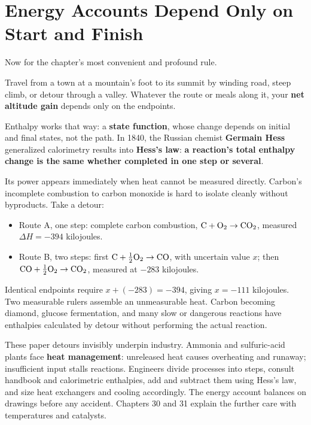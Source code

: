 \section{Energy Accounts Depend Only on Start and Finish}

Now for the chapter's most convenient and profound rule.

Travel from a town at a mountain's foot to its summit by winding road, steep climb, or detour through a valley. Whatever the route or meals along it, your \textbf{net altitude gain} depends only on the endpoints.

Enthalpy works that way: a \textbf{state function}, whose change depends on initial and final states, not the path. In 1840, the Russian chemist \textbf{Germain Hess} generalized calorimetry results into \textbf{Hess's law}: \textbf{a reaction's total enthalpy change is the same whether completed in one step or several}.

Its power appears immediately when heat cannot be measured directly. Carbon's incomplete combustion to carbon monoxide is hard to isolate cleanly without byproducts. Take a detour:

\begin{itemize}[itemsep=2pt]
\item Route A, one step: complete carbon combustion, $\mathrm{C} + \mathrm{O_2} \rightarrow \mathrm{CO_2}$, measured $\Delta H=-394$ kilojoules.
\item Route B, two steps: first $\mathrm{C} + \frac{1}{2}\mathrm{O_2} \rightarrow \mathrm{CO}$, with uncertain value $x$; then $\mathrm{CO} + \frac{1}{2}\mathrm{O_2} \rightarrow \mathrm{CO_2}$, measured at $-283$ kilojoules.
\end{itemize}

Identical endpoints require $x+(-283)=-394$, giving $x=-111$ kilojoules. Two measurable rulers assemble an unmeasurable heat. Carbon becoming diamond, glucose fermentation, and many slow or dangerous reactions have enthalpies calculated by detour without performing the actual reaction.

These paper detours invisibly underpin industry. Ammonia and sulfuric-acid plants face \textbf{heat management}: unreleased heat causes overheating and runaway; insufficient input stalls reactions. Engineers divide processes into steps, consult handbook and calorimetric enthalpies, add and subtract them using Hess's law, and size heat exchangers and cooling accordingly. The energy account balances on drawings before any accident. Chapters 30 and 31 explain the further care with temperatures and catalysts.

